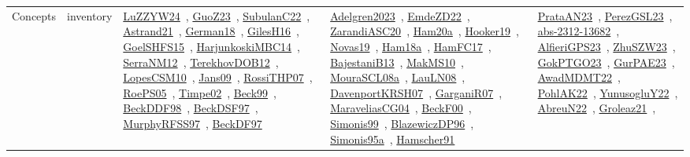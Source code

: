 {\begin{longtable}{lp{3cm}>{\raggedright\arraybackslash}p{6cm}>{\raggedright\arraybackslash}p{6cm}>{\raggedright\arraybackslash}p{8cm}}
\index{inventory}\index{Concepts!inventory}Concepts & inventory & \href{../works/LuZZYW24.pdf}{LuZZYW24}~\cite{LuZZYW24}, \href{../works/GuoZ23.pdf}{GuoZ23}~\cite{GuoZ23}, \href{../works/SubulanC22.pdf}{SubulanC22}~\cite{SubulanC22}, \href{../works/Astrand21.pdf}{Astrand21}~\cite{Astrand21}, \href{../works/German18.pdf}{German18}~\cite{German18}, \href{../works/GilesH16.pdf}{GilesH16}~\cite{GilesH16}, \href{../works/GoelSHFS15.pdf}{GoelSHFS15}~\cite{GoelSHFS15}, \href{../works/HarjunkoskiMBC14.pdf}{HarjunkoskiMBC14}~\cite{HarjunkoskiMBC14}, \href{../works/SerraNM12.pdf}{SerraNM12}~\cite{SerraNM12}, \href{../works/TerekhovDOB12.pdf}{TerekhovDOB12}~\cite{TerekhovDOB12}, \href{../works/LopesCSM10.pdf}{LopesCSM10}~\cite{LopesCSM10}, \href{../works/Jans09.pdf}{Jans09}~\cite{Jans09}, \href{../works/RossiTHP07.pdf}{RossiTHP07}~\cite{RossiTHP07}, \href{../works/RoePS05.pdf}{RoePS05}~\cite{RoePS05}, \href{../works/Timpe02.pdf}{Timpe02}~\cite{Timpe02}, \href{../works/Beck99.pdf}{Beck99}~\cite{Beck99}, \href{../works/BeckDDF98.pdf}{BeckDDF98}~\cite{BeckDDF98}, \href{../works/BeckDSF97.pdf}{BeckDSF97}~\cite{BeckDSF97}, \href{../works/MurphyRFSS97.pdf}{MurphyRFSS97}~\cite{MurphyRFSS97}, \href{../works/BeckDF97.pdf}{BeckDF97}~\cite{BeckDF97} & \href{../works/Adelgren2023.pdf}{Adelgren2023}~\cite{Adelgren2023}, \href{../works/EmdeZD22.pdf}{EmdeZD22}~\cite{EmdeZD22}, \href{../works/ZarandiASC20.pdf}{ZarandiASC20}~\cite{ZarandiASC20}, \href{../works/Ham20a.pdf}{Ham20a}~\cite{Ham20a}, \href{../works/Hooker19.pdf}{Hooker19}~\cite{Hooker19}, \href{../works/Novas19.pdf}{Novas19}~\cite{Novas19}, \href{../works/Ham18a.pdf}{Ham18a}~\cite{Ham18a}, \href{../works/HamFC17.pdf}{HamFC17}~\cite{HamFC17}, \href{../works/BajestaniB13.pdf}{BajestaniB13}~\cite{BajestaniB13}, \href{../works/MakMS10.pdf}{MakMS10}~\cite{MakMS10}, \href{../works/MouraSCL08a.pdf}{MouraSCL08a}~\cite{MouraSCL08a}, \href{../works/LauLN08.pdf}{LauLN08}~\cite{LauLN08}, \href{../works/DavenportKRSH07.pdf}{DavenportKRSH07}~\cite{DavenportKRSH07}, \href{../works/GarganiR07.pdf}{GarganiR07}~\cite{GarganiR07}, \href{../works/MaraveliasCG04.pdf}{MaraveliasCG04}~\cite{MaraveliasCG04}, \href{../works/BeckF00.pdf}{BeckF00}~\cite{BeckF00}, \href{../works/Simonis99.pdf}{Simonis99}~\cite{Simonis99}, \href{../works/BlazewiczDP96.pdf}{BlazewiczDP96}~\cite{BlazewiczDP96}, \href{../works/Simonis95a.pdf}{Simonis95a}~\cite{Simonis95a}, \href{../works/Hamscher91.pdf}{Hamscher91}~\cite{Hamscher91} & \href{../works/PrataAN23.pdf}{PrataAN23}~\cite{PrataAN23}, \href{../works/PerezGSL23.pdf}{PerezGSL23}~\cite{PerezGSL23}, \href{../works/abs-2312-13682.pdf}{abs-2312-13682}~\cite{abs-2312-13682}, \href{../works/AlfieriGPS23.pdf}{AlfieriGPS23}~\cite{AlfieriGPS23}, \href{../works/ZhuSZW23.pdf}{ZhuSZW23}~\cite{ZhuSZW23}, \href{../works/GokPTGO23.pdf}{GokPTGO23}~\cite{GokPTGO23}, \href{../works/GurPAE23.pdf}{GurPAE23}~\cite{GurPAE23}, \href{../works/AwadMDMT22.pdf}{AwadMDMT22}~\cite{AwadMDMT22}, \href{../works/PohlAK22.pdf}{PohlAK22}~\cite{PohlAK22}, \href{../works/YunusogluY22.pdf}{YunusogluY22}~\cite{YunusogluY22}, \href{../works/AbreuN22.pdf}{AbreuN22}~\cite{AbreuN22}, \href{../works/Groleaz21.pdf}{Groleaz21}~\cite{Groleaz21}, 
\end{longtable}}
